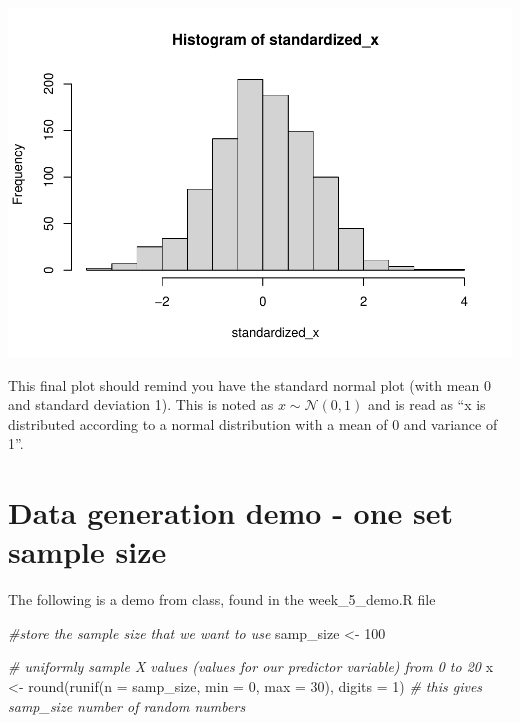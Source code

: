 \documentclass[
]{book}
\newenvironment{Shaded}{\begin{snugshade}}{\end{snugshade}}
\newcommand{\AttributeTok}[1]{\textcolor[rgb]{0.77,0.63,0.00}{#1}}
\newcommand{\CommentTok}[1]{\textcolor[rgb]{0.56,0.35,0.01}{\textit{#1}}}
\newcommand{\DecValTok}[1]{\textcolor[rgb]{0.00,0.00,0.81}{#1}}
\newcommand{\FunctionTok}[1]{\textcolor[rgb]{0.00,0.00,0.00}{#1}}
\newcommand{\NormalTok}[1]{#1}
\newcommand{\OtherTok}[1]{\textcolor[rgb]{0.56,0.35,0.01}{#1}}
\begin{document}
\includegraphics{test_course_notes_files/figure-latex/unnamed-chunk-76-1.pdf}

This final plot should remind you have the standard normal plot (with mean 0 and standard deviation 1). This is noted as \(x \sim \mathcal{N}(0, 1)\) and is read as ``x is distributed according to a normal distribution with a mean of 0 and variance of 1''.

\hypertarget{data-generation-demo---one-set-sample-size}{%
\section{Data generation demo - one set sample size}\label{data-generation-demo---one-set-sample-size}}

The following is a demo from class, found in the week\_5\_demo.R file

\begin{Shaded}
\begin{Highlighting}[]
\CommentTok{\#store the sample size that we want to use}
\NormalTok{samp\_size }\OtherTok{\textless{}{-}} \DecValTok{100}
\end{Highlighting}
\end{Shaded}

\begin{Shaded}
\begin{Highlighting}[]
\CommentTok{\# uniformly sample X values (values for our predictor variable) from 0 to 20 }
\NormalTok{x }\OtherTok{\textless{}{-}} \FunctionTok{round}\NormalTok{(}\FunctionTok{runif}\NormalTok{(}\AttributeTok{n =}\NormalTok{ samp\_size, }\AttributeTok{min =} \DecValTok{0}\NormalTok{, }\AttributeTok{max =} \DecValTok{30}\NormalTok{), }\AttributeTok{digits =} \DecValTok{1}\NormalTok{) }\CommentTok{\# this gives samp\_size number of random numbers}
\end{Highlighting}
\end{Shaded}
\end{document}
